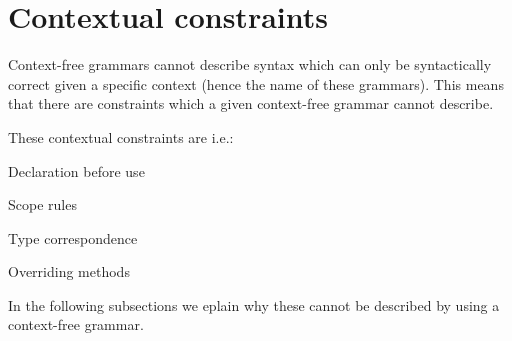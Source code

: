 \section{Contextual constraints}
\label{sec:contextualconstraints}

Context-free grammars cannot describe syntax which can only be syntactically
correct given a specific context (hence the name of these grammars). This means
that there are constraints which a given context-free grammar cannot describe.

These contextual constraints are i.e.\cite[pg. 39]{plpp}:

\begin{dlist}
\item Declaration before use
\item Scope rules
\item Type correspondence
\item Overriding methods
\end{dlist}

In the following subsections we eplain why these cannot be described by using a
context-free grammar.






